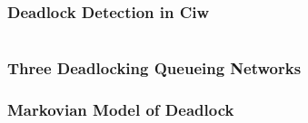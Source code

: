 \documentclass[xcolor={table}]{beamer}
\begin{document}
\begin{frame}
    \begin{figure}
    
    \end{figure}
\end{frame}

\begin{frame}
\frametitle{Deadlock Detection in Ciw}
\begin{center}
\fontsize{8.5pt}{10pt} \inputminted{python}{deadlockciw.py}
\end{center}
\end{frame}

\begin{frame}
\frametitle{Three Deadlocking Queueing Networks}
\end{frame}

\begin{frame}
    \frametitle{Markovian Model of Deadlock}
    \newline
\end{frame}
\end{document}
